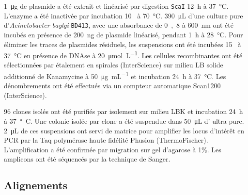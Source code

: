 \si{1\ug} de plasmide a été extrait et linéarisé par digestion \texttt{ScaI}
\si{12\hour} à \si{37\celsius}. L'enzyme a été inactivée par incubation
\si{10\min} à \si{70\celsius}. \si{390\uL} d'une culture pure
d'\emph{Acinetobacter baylyi} \texttt{BD413}, avec une absorbance de \si{0,8} à
\si{600\nm} ont été incubés en présence de \si{200\ng} de plasmide linéarisé,
pendant \si{1\hour} à \si{28\celsius}. Pour éliminer les traces de plasmides
résiduels, les suspensions ont été incubées \si{15\min} à \si{37\celsius} en
présence de DNAse à \SI{20}{\umol\per\L}. Les cellules recombinantes ont été
sélectionnées par étalement en spirales (InterScience) sur milieu LB solide
additionné de Kanamycine à \SI{50}{\ug\per\mL} et incubation \SI{24}{\hour} à
\SI{37}{\celsius}. Les dénombrements ont été effectués via un compteur
automatique Scan\textsuperscript{\textregistered}1200 (InterScience).

96 clones isolés ont été purifiés par isolement sur milieu LBK et incubation
\SI{24}{\hour} à \si{37°C}. Une colonie isolée par clone a été suspendue dans
\SI{50}{\uL} d' ultra-pure. \SI{2}{\uL} de ces suspensions ont servi de
matrice pour amplifier les locus d'intérêt en PCR par la Taq polymérase
haute fidélité Phusion (ThermoFischer). L'amplification a été confirmée par
migration sur gel d'agarose à 1\%. Les amplicons ont été séquencés par la
technique de Sanger.

\subsection{Alignements}
\label{subsec:align}


